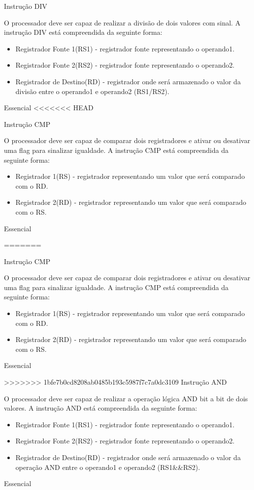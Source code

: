 \documentclass{article}
\begin{document}
\begin{functional}
       \requirement
      {Instrução DIV}
      {O processador deve ser capaz de realizar a divisão de dois valores com sinal.
      A instrução DIV está compreendida da seguinte forma:
       \begin{itemize}
        \item Registrador Fonte 1(RS1) - registrador fonte representando o operando1.
        \item Registrador Fonte 2(RS2) - registrador fonte representando o operando2.
        \item Registrador de Destino(RD) - registrador onde será armazenado o valor da divisão entre o operando1 e operando2 (RS1/RS2).
       \end{itemize}}
      {Essencial}
<<<<<<< HEAD
      
     \requirement
      {Instrução CMP}
      {O processador deve ser capaz de comparar dois registradores e ativar ou desativar uma flag para sinalizar igualdade.
      A instrução CMP está compreendida da seguinte forma:
      \begin{itemize}
       \item Registrador 1(RS) - registrador representando um valor que será comparado com o RD.
       \item Registrador 2(RD) - registrador representando um valor que será comparado com o RS.
      \end{itemize}

      {Essencial}
      
=======

     \requirement
      {Instrução CMP}
      {O processador deve ser capaz de comparar dois registradores e ativar ou desativar uma flag para sinalizar igualdade.
      A instrução CMP está compreendida da seguinte forma:
      \begin{itemize}
       \item Registrador 1(RS) - registrador representando um valor que será comparado com o RD.
       \item Registrador 2(RD) - registrador representando um valor que será comparado com o RS.
      \end{itemize}

      {Essencial}

>>>>>>> 1bfe7b0cd8208ab0485b193c5987f7c7a0dc3109
      \requirement
      {Instrução AND}
      {O processador deve ser capaz de realizar a operação lógica AND bit a bit de dois valores.
      A instrução AND está compreendida da seguinte forma:
       \begin{itemize}
        \item Registrador Fonte 1(RS1) - registrador fonte representando o operando1.
        \item Registrador Fonte 2(RS2) - registrador fonte representando o operando2.
        \item Registrador de Destino(RD) - registrador onde será armazenado o valor da operação AND entre o operando1 e operando2 (RS1&&RS2).
       \end{itemize}}
      {Essencial}

}}
\end{functional}
\end{document}
